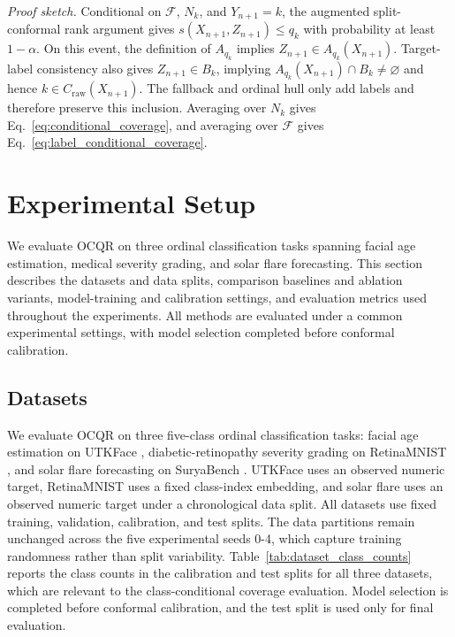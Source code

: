 \documentclass[conference]{IEEEtran}
\begin{document}
\noindent\textit{Proof sketch.}
Conditional on \(\mathcal{F}\), \(N_k\), and \(Y_{n+1}=k\), the augmented split-conformal rank argument gives \(s(X_{n+1},Z_{n+1})\le q_k\) with probability at least \(1-\alpha\). On this event, the definition of \(A_{q_k}\) implies \(Z_{n+1}\in A_{q_k}(X_{n+1})\). Target-label consistency also gives \(Z_{n+1}\in B_k\), implying \(A_{q_k}(X_{n+1})\cap B_k\neq\varnothing\) and hence \(k\in C_{\mathrm{raw}}(X_{n+1})\). The fallback and ordinal hull only add labels and therefore preserve this inclusion. Averaging over \(N_k\) gives Eq.~\eqref{eq:conditional_coverage}, and averaging over \(\mathcal{F}\) gives Eq.~\eqref{eq:label_conditional_coverage}.

\section{Experimental Setup}
\label{sec:experimental_setup}
We evaluate OCQR on three ordinal classification tasks spanning facial age estimation, medical severity grading, and solar flare forecasting. This section describes the datasets and data splits, comparison baselines and ablation variants, model-training and calibration settings, and evaluation metrics used throughout the experiments. All methods are evaluated under a common experimental settings, with model selection completed before conformal calibration.


\subsection{Datasets}
\label{subsec:datasets}
We evaluate OCQR on three five-class ordinal classification tasks: facial age estimation on UTKFace \cite{utkface-zhifei2017cvpr}, diabetic-retinopathy severity grading on RetinaMNIST \cite{medmnistv2}, and solar flare forecasting on SuryaBench \cite{roy2026suryabench}. UTKFace uses an observed numeric target, RetinaMNIST uses a fixed class-index embedding, and solar flare uses an observed numeric target under a chronological data split. All datasets use fixed training, validation, calibration, and test splits. The data partitions remain unchanged across the five experimental seeds 0-4, which capture training randomness rather than split variability. Table~\ref{tab:dataset_class_counts} reports the class counts in the calibration and test splits for all three datasets, which are relevant to the class-conditional coverage evaluation. Model selection is completed before conformal calibration, and the test split is used only for final evaluation. 
\end{document}
